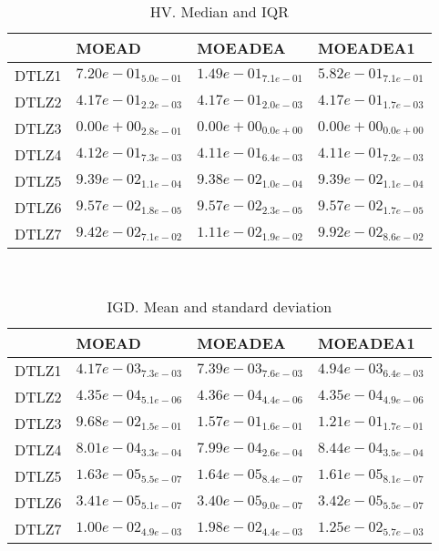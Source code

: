 \documentclass{article}
\begin{document}
\begin{table}
\caption{HV. Median and IQR}
\label{table:median.HV}
\begin{scriptsize}
\centering
\begin{tabular}{llll}
\hline & MOEAD & MOEADEA &  MOEADEA1\\
\hline
DTLZ1 & \cellcolor{gray95}$  7.20e-01_{ 5.0e-01}$ & $  1.49e-01_{ 7.1e-01}$ & $  5.82e-01_{ 7.1e-01}$ \\
DTLZ2 & \cellcolor{gray95}$  4.17e-01_{ 2.2e-03}$ & $  4.17e-01_{ 2.0e-03}$ & $  4.17e-01_{ 1.7e-03}$ \\
DTLZ3 & $  0.00e+00_{ 2.8e-01}$ & $  0.00e+00_{ 0.0e+00}$ & $  0.00e+00_{ 0.0e+00}$ \\
DTLZ4 & \cellcolor{gray95}$  4.12e-01_{ 7.3e-03}$ & $  4.11e-01_{ 6.4e-03}$ & $  4.11e-01_{ 7.2e-03}$ \\
DTLZ5 & \cellcolor{gray95}$  9.39e-02_{ 1.1e-04}$ & $  9.38e-02_{ 1.0e-04}$ & $  9.39e-02_{ 1.1e-04}$ \\
DTLZ6 & \cellcolor{gray95}$  9.57e-02_{ 1.8e-05}$ & $  9.57e-02_{ 2.3e-05}$ & $  9.57e-02_{ 1.7e-05}$ \\
DTLZ7 & \cellcolor{gray25}$  9.42e-02_{ 7.1e-02}$ & $  1.11e-02_{ 1.9e-02}$ & \cellcolor{gray95}$  9.92e-02_{ 8.6e-02}$ \\
\hline
\end{tabular}
\end{scriptsize}
\end{table}
\
\begin{table}
\caption{IGD. Mean and standard deviation}
\label{table:mean.IGD}
\centering
\begin{scriptsize}
\begin{tabular}{llll}
\hline & MOEAD & MOEADEA &  MOEADEA1\\
\hline
DTLZ1 & \cellcolor{gray95}$  4.17e-03_{ 7.3e-03}$ & $  7.39e-03_{ 7.6e-03}$ & $  4.94e-03_{ 6.4e-03}$ \\
DTLZ2 & \cellcolor{gray25}$  4.35e-04_{ 5.1e-06}$ & $  4.36e-04_{ 4.4e-06}$ & \cellcolor{gray95}$  4.35e-04_{ 4.9e-06}$ \\
DTLZ3 & \cellcolor{gray95}$  9.68e-02_{ 1.5e-01}$ & $  1.57e-01_{ 1.6e-01}$ & $  1.21e-01_{ 1.7e-01}$ \\
DTLZ4 & \cellcolor{gray25}$  8.01e-04_{ 3.3e-04}$ & \cellcolor{gray95}$  7.99e-04_{ 2.6e-04}$ & $  8.44e-04_{ 3.5e-04}$ \\
DTLZ5 & \cellcolor{gray25}$  1.63e-05_{ 5.5e-07}$ & $  1.64e-05_{ 8.4e-07}$ & \cellcolor{gray95}$  1.61e-05_{ 8.1e-07}$ \\
DTLZ6 & \cellcolor{gray25}$  3.41e-05_{ 5.1e-07}$ & \cellcolor{gray95}$  3.40e-05_{ 9.0e-07}$ & $  3.42e-05_{ 5.5e-07}$ \\
DTLZ7 & \cellcolor{gray95}$  1.00e-02_{ 4.9e-03}$ & $  1.98e-02_{ 4.4e-03}$ & $  1.25e-02_{ 5.7e-03}$ \\
\hline
\end{tabular}
\end{scriptsize}
\end{table}
\end{document}
